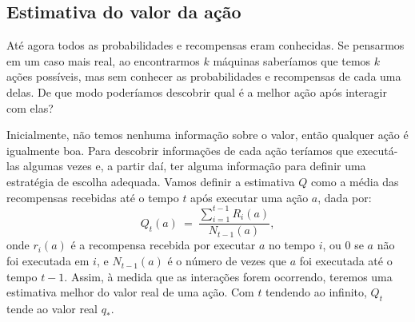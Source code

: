 \documentclass{article}
\begin{document}
        \subsection{Estimativa do valor da ação}

            Até agora todos as probabilidades e recompensas eram conhecidas. Se pensarmos em um caso mais real, ao encontrarmos $k$ máquinas saberíamos que temos $k$ ações possíveis, mas sem conhecer as probabilidades e recompensas de cada uma delas. De que modo poderíamos descobrir qual é a melhor ação após interagir com elas?

            Inicialmente, não temos nenhuma informação sobre o valor, então qualquer ação é igualmente boa. Para descobrir informações de cada ação teríamos que executá-las algumas vezes e, a partir daí, ter alguma informação para definir uma estratégia de escolha adequada. Vamos definir a estimativa $Q$ como a média das recompensas recebidas até o tempo $t$ após executar uma ação $a$, dada por:
            \begin{equation}
            \label{eq:estimativa-acao}
                Q_t(a) \ = \ \frac{\sum\limits_{i=1}^{t-1} R_i(a)}{N_{t-1}(a)} ,
            \end{equation}
            onde $r_i(a)$ é a recompensa recebida por executar $a$ no tempo $i$, ou $0$ se $a$ não foi executada em $i$, e $N_{t-1}(a)$ é o número de vezes que $a$ foi executada até o tempo $t-1$. Assim, à medida que as interações forem ocorrendo, teremos uma estimativa melhor do valor real de uma ação. Com $t$ tendendo ao infinito, $Q_t$ tende ao valor real $q_*$.
\end{document}
